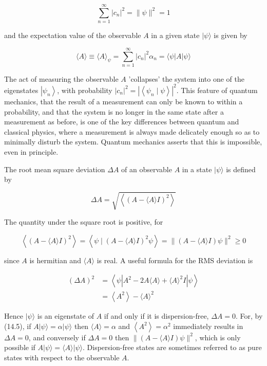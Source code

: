 \documentclass[10pt]{article}
\begin{document}
$$
\sum_{n=1}^{\infty}\left|c_{n}\right|^{2}=\|\psi\|^{2}=1
$$

and the expectation value of the observable $A$ in a given state $|\psi\rangle$ is given by

$$
\langle A\rangle \equiv\langle A\rangle_{\psi}=\sum_{n=1}^{\infty}\left|c_{n}\right|^{2} \alpha_{n}=\langle\psi|A| \psi\rangle
$$

The act of measuring the observable $A$ 'collapses' the system into one of the eigenstates $\left|\psi_{n}\right\rangle$, with probability $\left|c_{n}\right|^{2}=\left|\left\langle\psi_{n} \mid \psi\right\rangle\right|^{2}$. This feature of quantum mechanics, that the result of a measurement can only be known to within a probability, and that the system is no longer in the same state after a measurement as before, is one of the key differences between quantum and classical physics, where a measurement is always made delicately enough so as to minimally disturb the system. Quantum mechanics asserts that this is impossible, even in principle.

The root mean square deviation $\Delta A$ of an observable $A$ in a state $|\psi\rangle$ is defined by

$$
\Delta A=\sqrt{\left\langle(A-\langle A\rangle I)^{2}\right\rangle}
$$

The quantity under the square root is positive, for

$$
\left\langle(A-\langle A\rangle I)^{2}\right\rangle=\left\langle\psi \mid(A-\langle A\rangle I)^{2} \psi\right\rangle=\|(A-\langle A\rangle I) \psi\|^{2} \geq 0
$$

since $A$ is hermitian and $\langle A\rangle$ is real. A useful formula for the RMS deviation is

$$
\begin{aligned}
(\Delta A)^{2} & =\left\langle\psi\left|A^{2}-2 A\langle A\rangle+\langle A\rangle^{2} I\right| \psi\right\rangle \\
& =\left\langle A^{2}\right\rangle-\langle A\rangle^{2}
\end{aligned}
$$

Hence $|\psi\rangle$ is an eigenstate of $A$ if and only if it is dispersion-free, $\Delta A=0$. For, by (14.5), if $A|\psi\rangle=\alpha|\psi\rangle$ then $\langle A\rangle=\alpha$ and $\left\langle A^{2}\right\rangle=\alpha^{2}$ immediately results in $\Delta A=0$, and conversely if $\Delta A=0$ then $\|(A-\langle A\rangle I) \psi\|^{2}$, which is only possible if $A|\psi\rangle=\langle A\rangle|\psi\rangle$. Dispersion-free states are sometimes referred to as pure states with respect to the observable $A$.
\end{document}
